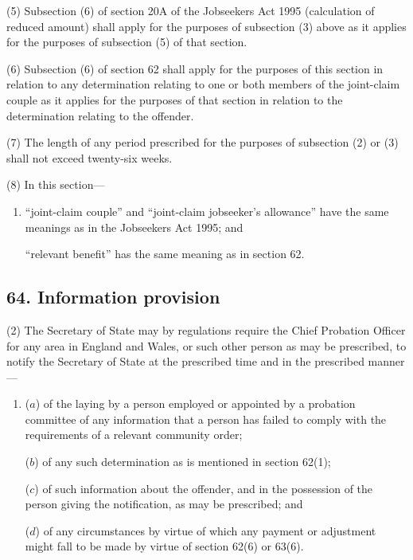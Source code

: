 \documentclass[12pt,a4paper]{article}
\begin{document}
(5) Subsection (6)  of section 20A of the Jobseekers Act 1995 (calculation of reduced amount) shall apply for the purposes of subsection (3)  above as it applies for the purposes of subsection (5)  of that section.

(6) Subsection (6)  of section 62 shall apply for the purposes of this section in relation to any determination relating to one or both members of the joint-claim couple as it applies for the purposes of that section in relation to the determination relating to the offender.

(7) The length of any period prescribed for the purposes of subsection (2)  or (3)  shall not exceed twenty-six weeks.

(8) In this section—
\begin{enumerate}\item[]
    “joint-claim couple” and “joint-claim jobseeker’s allowance” have the same meanings as in the Jobseekers Act 1995; and

    “relevant benefit” has the same meaning as in section 62.  
\end{enumerate}


\subsection{64. Information provision}


(2) The Secretary of State may by regulations require the Chief Probation Officer for any area in England and Wales, or such other person as may be prescribed, to notify the Secretary of State at the prescribed time and in the prescribed manner—
\begin{enumerate}\item[]
($a$) of the laying by a person employed or appointed by a probation committee of any information that a person has failed to comply with the requirements of a relevant community order;

($b$) of any such determination as is mentioned in section 62(1);

($c$) of such information about the offender, and in the possession of the person giving the notification, as may be prescribed; and

($d$) of any circumstances by virtue of which any payment or adjustment might fall to be made by virtue of section 62(6)  or 63(6).
\end{enumerate}
\end{document}
